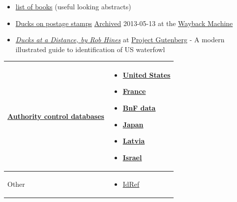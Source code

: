\documentclass[11pt,a4paper]{article}
\begin{document}
\begin{itemize}
\item \href{https://web.archive.org/web/20060613210555/http://seaducks.org/subjects/MIGRATION\%20AND\%20FLIGHT.htm}{list of books} (useful looking abstracts)
\item \href{http://www.stampsbook.org/subject/Duck.html}{Ducks on postage stamps} \href{https://web.archive.org/web/20130513022903/http://www.stampsbook.org/subject/Duck.html}{Archived} 2013-05-13 at the \href{/wiki/Wayback\_Machine}{Wayback Machine}
\item \href{https://gutenberg.org/ebooks/18884}{\textit{Ducks at a Distance, by Rob Hines}} at \href{/wiki/Project\_Gutenberg}{Project Gutenberg} - A modern illustrated guide to identification of US waterfowl
\end{itemize}

\begin{table}[h]
\begin{tabular}{|l|l|}
\hline
\href{/wiki/Help:Authority\_control}{Authority control databases}  \begin{figure}[h] %
National & \begin{itemize} \item \href{https://id.loc.gov/authorities/sh85039879}{United States} \item \href{https://catalogue.bnf.fr/ark:/12148/cb119761481}{France} \item \href{https://data.bnf.fr/ark:/12148/cb119761481}{BnF data} \item \href{https://id.ndl.go.jp/auth/ndlna/00564819}{Japan} \item \href{https://kopkatalogs.lv/F?func=direct\&local\_base=lnc10\&doc\_number=000090751\&P\_CON\_LNG=ENG}{Latvia} \item \href{http://olduli.nli.org.il/F/?func=find-b\&local\_base=NLX10\&find\_code=UID\&request=987007565486205171}{Israel} \end{itemize} \\ \hline
Other & \begin{itemize} \item \href{https://www.idref.fr/027796124}{IdRef} \end{itemize} \\ \hline
\end{tabular}
\end{table}
\end{document}
